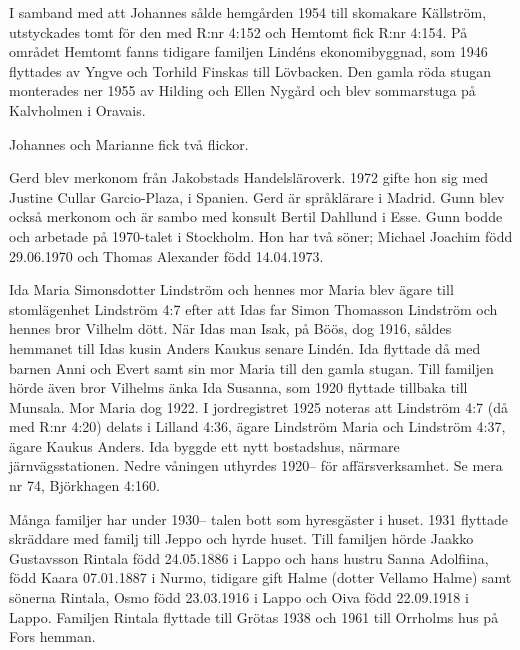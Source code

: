 I samband med att Johannes sålde hemgården 1954 till skomakare Källström, utstyckades tomt för den med R:nr 4:152 och Hemtomt fick R:nr 4:154. På området Hemtomt fanns tidigare familjen Lindéns ekonomibyggnad, som 1946 flyttades av Yngve och Torhild Finskas till Lövbacken. Den gamla röda stugan monterades ner 1955 av Hilding och Ellen Nygård och blev sommarstuga på Kalvholmen i Oravais.

Johannes och Marianne fick två flickor.
\begin{jhchildren}
  \item {}
  \item {}
\end{jhchildren}
Gerd blev merkonom från Jakobstads Handelsläroverk. 1972 gifte hon sig med Justine Cullar Garcio-Plaza,  i Spanien. Gerd är språklärare i Madrid. Gunn blev också merkonom och är sambo med konsult Bertil Dahllund i Esse. Gunn bodde och arbetade på 1970-talet i Stockholm. Hon har två söner; Michael Joachim född 29.06.1970 och Thomas Alexander född 14.04.1973.


Ida Maria Simonsdotter Lindström och hennes mor Maria blev ägare till stomlägenhet Lindström 4:7 efter att Idas far Simon Thomasson Lindström och hennes bror Vilhelm dött. När Idas man Isak,  på Böös, dog 1916, såldes hemmanet till Idas kusin Anders Kaukus senare Lindén. Ida flyttade då med barnen Anni och Evert samt sin mor Maria till den gamla stugan. Till familjen hörde även bror Vilhelms änka Ida Susanna, som 1920 flyttade tillbaka till Munsala. Mor Maria dog 1922. I jordregistret 1925 noteras att Lindström 4:7 (då med R:nr 4:20) delats i Lilland 4:36, ägare Lindström Maria och Lindström 4:37, ägare Kaukus Anders. Ida byggde ett nytt bostadshus, närmare järnvägsstationen. Nedre våningen uthyrdes 1920-- för affärsverksamhet. Se mera nr 74, Björkhagen 4:160.



Många familjer har under 1930-- talen bott som hyresgäster i huset. 1931 flyttade skräddare  med familj till Jeppo och hyrde huset. Till familjen hörde Jaakko Gustavsson Rintala född 24.05.1886 i Lappo och hans hustru Sanna Adolfiina, född Kaara 07.01.1887 i Nurmo, tidigare gift Halme (dotter Vellamo Halme) samt sönerna Rintala, Osmo född 23.03.1916 i Lappo och Oiva född 22.09.1918 i Lappo. Familjen Rintala flyttade till Grötas 1938 och 1961 till Orrholms hus på Fors hemman.

